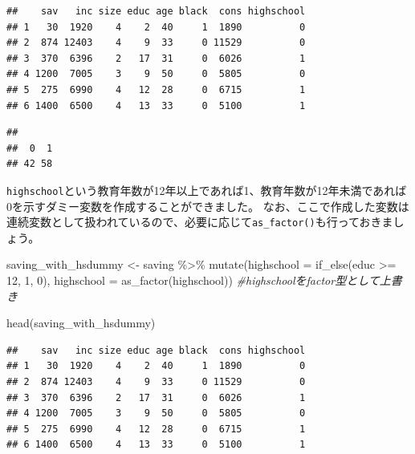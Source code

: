 \documentclass[
]{book}
\newenvironment{Shaded}{\begin{snugshade}}{\end{snugshade}}
\newcommand{\AttributeTok}[1]{\textcolor[rgb]{0.77,0.63,0.00}{#1}}
\newcommand{\CommentTok}[1]{\textcolor[rgb]{0.56,0.35,0.01}{\textit{#1}}}
\newcommand{\DecValTok}[1]{\textcolor[rgb]{0.00,0.00,0.81}{#1}}
\newcommand{\FunctionTok}[1]{\textcolor[rgb]{0.00,0.00,0.00}{#1}}
\newcommand{\NormalTok}[1]{#1}
\newcommand{\OtherTok}[1]{\textcolor[rgb]{0.56,0.35,0.01}{#1}}
\newcommand{\SpecialCharTok}[1]{\textcolor[rgb]{0.00,0.00,0.00}{#1}}
\begin{document}
\begin{verbatim}
##    sav   inc size educ age black  cons highschool
## 1   30  1920    4    2  40     1  1890          0
## 2  874 12403    4    9  33     0 11529          0
## 3  370  6396    2   17  31     0  6026          1
## 4 1200  7005    3    9  50     0  5805          0
## 5  275  6990    4   12  28     0  6715          1
## 6 1400  6500    4   13  33     0  5100          1
\end{verbatim}

\begin{Shaded}
\end{Shaded}

\begin{verbatim}
## 
##  0  1 
## 42 58
\end{verbatim}

\texttt{highschool}という教育年数が12年以上であれば1、教育年数が12年未満であれば0を示すダミー変数を作成することができました。
なお、ここで作成した変数は連続変数として扱われているので、必要に応じて\texttt{as\_factor()}も行っておきましょう。

\begin{Shaded}
\begin{Highlighting}[]
\NormalTok{saving\_with\_hsdummy }\OtherTok{\textless{}{-}}
\NormalTok{  saving }\SpecialCharTok{\%\textgreater{}\%}
    \FunctionTok{mutate}\NormalTok{(}\AttributeTok{highschool =} \FunctionTok{if\_else}\NormalTok{(educ }\SpecialCharTok{\textgreater{}=} \DecValTok{12}\NormalTok{, }\DecValTok{1}\NormalTok{, }\DecValTok{0}\NormalTok{),}
           \AttributeTok{highschool =} \FunctionTok{as\_factor}\NormalTok{(highschool)) }\CommentTok{\#highschoolをfactor型として上書き}

\FunctionTok{head}\NormalTok{(saving\_with\_hsdummy)}
\end{Highlighting}
\end{Shaded}

\begin{verbatim}
##    sav   inc size educ age black  cons highschool
## 1   30  1920    4    2  40     1  1890          0
## 2  874 12403    4    9  33     0 11529          0
## 3  370  6396    2   17  31     0  6026          1
## 4 1200  7005    3    9  50     0  5805          0
## 5  275  6990    4   12  28     0  6715          1
## 6 1400  6500    4   13  33     0  5100          1
\end{verbatim}
\end{document}
